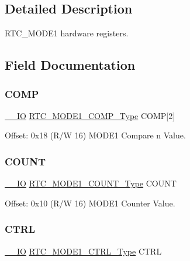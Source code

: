 \subsection{Detailed Description}
R\+T\+C\+\_\+\+M\+O\+D\+E1 hardware registers. 

\subsection{Field Documentation}
\mbox{\label{struct_rtc_mode1_a7b60a62749d701b6a656e845cebad3e7}} 
\subsubsection{\texorpdfstring{COMP}{COMP}}
{\footnotesize\ttfamily \mbox{\hyperlink{core__cm0plus_8h_aec43007d9998a0a0e01faede4133d6be}{\+\_\+\+\_\+\+IO}} \mbox{\hyperlink{union_r_t_c___m_o_d_e1___c_o_m_p___type}{R\+T\+C\+\_\+\+M\+O\+D\+E1\+\_\+\+C\+O\+M\+P\+\_\+\+Type}} C\+O\+MP\mbox{[}2\mbox{]}}



Offset\+: 0x18 (R/W 16) M\+O\+D\+E1 Compare n Value. 

\mbox{\label{struct_rtc_mode1_a0808842545395ceeb23b965868dd47a5}} 
\subsubsection{\texorpdfstring{COUNT}{COUNT}}
{\footnotesize\ttfamily \mbox{\hyperlink{core__cm0plus_8h_aec43007d9998a0a0e01faede4133d6be}{\+\_\+\+\_\+\+IO}} \mbox{\hyperlink{union_r_t_c___m_o_d_e1___c_o_u_n_t___type}{R\+T\+C\+\_\+\+M\+O\+D\+E1\+\_\+\+C\+O\+U\+N\+T\+\_\+\+Type}} C\+O\+U\+NT}



Offset\+: 0x10 (R/W 16) M\+O\+D\+E1 Counter Value. 

\mbox{\label{struct_rtc_mode1_abc953796e153257ef23f96db59073ff4}} 
\subsubsection{\texorpdfstring{CTRL}{CTRL}}
{\footnotesize\ttfamily \mbox{\hyperlink{core__cm0plus_8h_aec43007d9998a0a0e01faede4133d6be}{\+\_\+\+\_\+\+IO}} \mbox{\hyperlink{union_r_t_c___m_o_d_e1___c_t_r_l___type}{R\+T\+C\+\_\+\+M\+O\+D\+E1\+\_\+\+C\+T\+R\+L\+\_\+\+Type}} C\+T\+RL}



